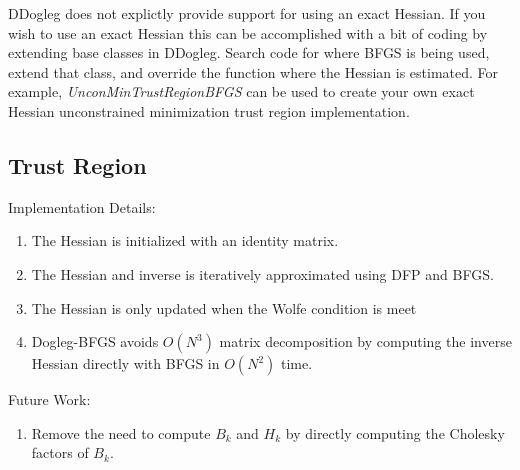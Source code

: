 \documentclass[peerreview,compsoc,onecolumn]{IEEEtran}
\newenvironment{enumargin}[1]{\begin{enumerate}[leftmargin=#1\textwidth , rightmargin=#1\textwidth]}{\end{enumerate}}
\begin{document}
DDogleg does not explictly provide support for using an exact Hessian. If you wish to use an exact Hessian this can be accomplished with a bit of coding by extending base classes in DDogleg. Search code for where BFGS is being used, extend that class, and override the function where the Hessian is estimated. For example, \textit{UnconMinTrustRegionBFGS} can be used to create your own exact Hessian unconstrained minimization trust region implementation.

\subsection{Trust Region}

Implementation Details:
\begin{enumargin}{0.2}
    \item The Hessian is initialized with an identity matrix. 
	\item The Hessian and inverse is iteratively approximated using DFP and BFGS.
	\item The Hessian is only updated when the Wolfe condition is meet
	\item Dogleg-BFGS avoids $O(N^3)$ matrix decomposition by computing the inverse Hessian directly with BFGS in $O(N^2)$ time.
\end{enumargin}

Future Work:
\begin{enumargin}{0.2}
	\item Remove the need to compute $B_k$ and $H_k$ by directly computing the Cholesky factors of $B_k$. 
\end{enumargin}
\end{document}

